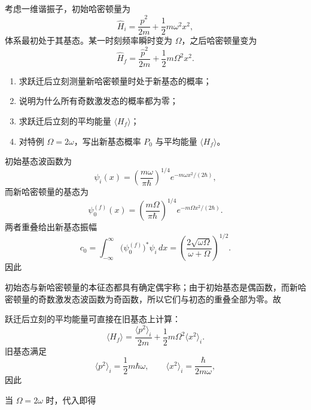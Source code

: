﻿

\begin{question}
考虑一维谐振子，初始哈密顿量为
\[
\hat H_i=\frac{\hat p^2}{2m}+\frac12 m\omega^2 x^2,
\]
体系最初处于其基态。某一时刻频率瞬时变为 $\Omega$，之后哈密顿量变为
\[
\hat H_f=\frac{\hat p^2}{2m}+\frac12 m\Omega^2 x^2.
\]

\begin{enumerate}[label=(\arabic*),leftmargin=2.5em]
  \item 求跃迁后立刻测量新哈密顿量时处于新基态的概率；
  \item 说明为什么所有奇数激发态的概率都为零；
  \item 求跃迁后立刻的平均能量 $\langle H_f\rangle$；
  \item 对特例 $\Omega=2\omega$，写出新基态概率 $P_0$ 与平均能量 $\langle H_f\rangle$。
\end{enumerate}

\begin{solution}
初始基态波函数为
\[
\psi_i(x)=\left(\frac{m\omega}{\pi\hbar}\right)^{1/4}e^{-m\omega x^2/(2\hbar)},
\]
而新哈密顿量的基态为
\[
\psi_0^{(f)}(x)=\left(\frac{m\Omega}{\pi\hbar}\right)^{1/4}e^{-m\Omega x^2/(2\hbar)}.
\]
两者重叠给出新基态振幅
\[
c_0=\int_{-\infty}^{\infty} \bigl(\psi_0^{(f)}\bigr)^*\psi_i\,dx
=\left(\frac{2\sqrt{\omega\Omega}}{\omega+\Omega}\right)^{1/2}.
\]
因此

初始态与新哈密顿量的本征态都具有确定偶宇称；由于初始基态是偶函数，而新哈密顿量的奇数激发态波函数为奇函数，所以它们与初态的重叠全部为零。故

跃迁后立刻的平均能量可直接在旧基态上计算：
\[
\langle H_f\rangle=\frac{\langle p^2\rangle_i}{2m}+\frac12 m\Omega^2\langle x^2\rangle_i.
\]
旧基态满足
\[
\langle p^2\rangle_i=\frac12 m\hbar\omega,
\qquad
\langle x^2\rangle_i=\frac{\hbar}{2m\omega},
\]
因此

当 $\Omega=2\omega$ 时，代入即得
\end{solution}
\end{question}

